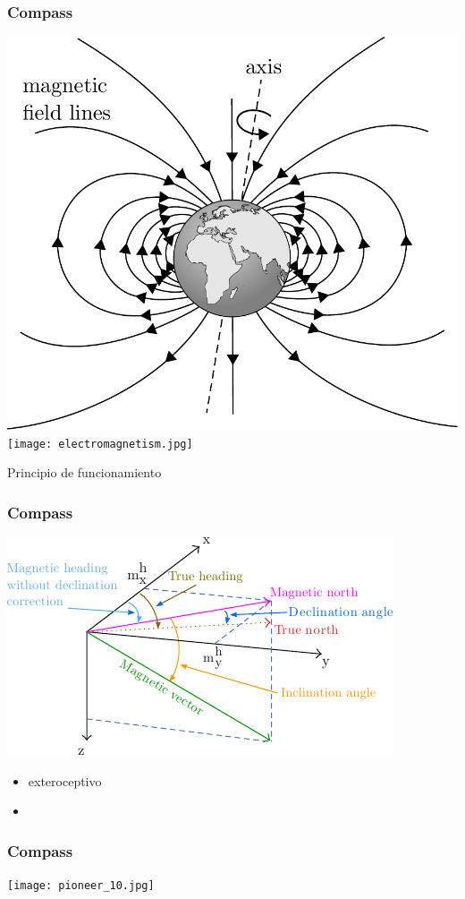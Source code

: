 \begin{frame}
    \frametitle{Compass}

        \includegraphics[width=0.4\columnwidth]{images/earth_magnetic_field.pdf}
        \texttt{[image: electromagnetism.jpg]}

    \begin{block}{Principio de funcionamiento}

    \end{block}
\end{frame}

\begin{frame}
    \frametitle{Compass}

    \begin{center}
        \includegraphics[width=0.5\columnwidth]{images/magnetic_field.pdf}
    \end{center}

    \begin{itemize}
        \item exteroceptivo
        \item
    \end{itemize}
\end{frame}

\begin{frame}
    \frametitle{Compass}

    \begin{center}
        \texttt{[image: pioneer\_10.jpg]}
    \end{center}
\end{frame}